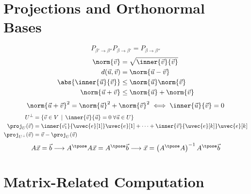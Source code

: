 \documentclass[10pt, a4paper]{article}
\begin{document}
\begin{landscape}
\begin{multicols}{3}
    \section{Projections and Orthonormal Bases}

    \[P_{\beta' \to \beta''} P_{\beta \to \beta'} = P_{\beta \to \beta''}\]
    \begin{align*}
        \norm{\vec{v}} &= \sqrt{\inner{\vec{v}}{\vec{v}}} \\
        d(\vec{u}, \vec{v}) &= \norm{\vec{u} - \vec{v}} \\
        \abs{\inner{\vec{u}}{\vec{v}}} &\leq \norm{\vec{u}} \norm{\vec{v}} \\
        \norm{\vec{u} + \vec{v}} &\leq \norm{\vec{u}} + \norm{\vec{v}}
    \end{align*}
    \[
        \norm{\vec{u} + \vec{v}}^{2} = \norm{\vec{u}}^{2} + \norm{\vec{v}}^{2} \iff \inner{\vec{u}}{\vec{v}} = 0
    \]
    \begin{align*}
        U^{\perp} &= \left\{ \vec{v} \in V \,\mid\, \inner{\vec{v}}{\vec{u}} = 0 \;\forall \vec{u} \in U \right\} \\
        \proj_{U} (\vec{v}) &= \inner{\vec{v_1}}{\uvec{e}[1]} \uvec{e}[1] + \cdots + \inner{\vec{v}}{\uvec{e}[k]} \uvec{e}[k] \\
    \proj_{U^{\perp}} (\vec{v}) &= \vec{v} - \proj_{U} (\vec{v})
    \end{align*}
    \[A\vec{x} = \vec{b} \longrightarrow A^{\tpose} A \vec{x} = A^{\tpose} \vec{b}
    \longrightarrow \vec{x} = \left(A^{\tpose} A\right)^{-1} A^{\tpose} \vec{b}\]

    \section{Matrix-Related Computation}


\end{multicols}
\end{landscape}
\end{document}
